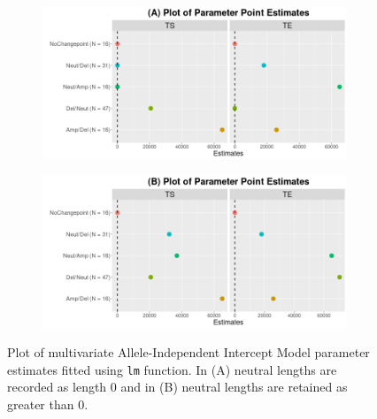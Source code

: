 \begin{figure}[H]
\vspace{1cm}
     \begin{subfigure}[t]{.49\textwidth}
      \centering
      \includegraphics[width = 1\textwidth]{../figures/Chapter_5/Multivariate_lm_7_AI_Interval.png}
    \end{subfigure}%
     \begin{subfigure}[t]{.49\textwidth}
      \centering
       \includegraphics[width = 1\textwidth]{../figures/Chapter_5/Multivariate_lm_7_Neut_AI_Interval.png}
    \end{subfigure} 
     \caption[Plot of multivariate Allele-Independent Intercept Model parameter estimates fitted using \texttt{lm} function.]{Plot of multivariate Allele-Independent Intercept Model parameter estimates fitted using \texttt{lm} function. In (A) neutral lengths are recorded as length 0 and in (B) neutral lengths are retained as greater than 0.}
     \label{fig:lm_multi_1_int}
\end{figure}

